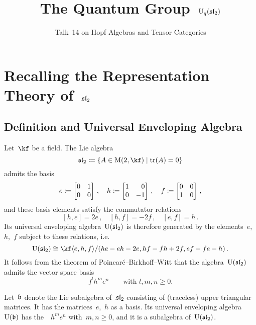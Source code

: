 \documentclass[a4paper, 11pt, oneside]{scrartcl}
\title{The Quantum Group~$\operatorname{U}_q(\mathfrak{sl}_2)$}
\subtitle{Talk~14 on Hopf Algebras and Tensor Categories}
\author{}
\date{}
\begin{document}
\maketitle

\vspace{-4em}





\section{Recalling the Representation Theory of~$\mathfrak{sl}_2$}



\subsection{Definition and Universal Enveloping Algebra}

Let~$\kf$ be a field.
The Lie algebra
\[
  \sllie_2
  \defined
  \{
    A \in \Mat(2, \kf)
  \suchthat
    \tr(A) = 0
  \}
\]
admits the basis
\[
  e
  \defined
  \begin{bmatrix}
    0 & 1 \\
    0 & 0
  \end{bmatrix} \,,
  \quad
  h
  \defined
  \begin{bmatrix*}[r]
    1 &  0 \\
    0 & -1
  \end{bmatrix*} \,,
  \quad
  f
  \defined
  \begin{bmatrix}
    0 & 0 \\
    1 & 0
  \end{bmatrix} \,,
\]
and these basis elements satisfy the commutator relations
\[
  [h, e] = 2e \,,
  \quad
  [h, f] = -2f \,,
  \quad
  [e, f] = h \,.
\]
Its universal enveloping algebra~$\operatorname{U}(\mathfrak{sl}_2)$ is therefore generated by the elements~$e$,~$h$,~$f$ subject to these relations, i.e.
\[
  \Univ(\sllie_2)
  \cong
  \kf\gen{e, h, f}
  /
  \genideal{he - eh - 2e, hf - fh + 2f, ef - fe - h} \,.
\]
It follows from the theorem of Poincaré--Birkhoff--Witt that the algebra~$\operatorname{U}(\mathfrak{sl}_2)$ admits the vector space basis
\[
  f^l h^m e^n
  \qquad
  \text{with~$l, m, n \geq 0$.}
\]

Let~$\mathfrak{b}$ denote the Lie subalgebra of~$\mathfrak{sl}_2$ consisting of (traceless) upper triangular matrices.
It has the matrices~$e$,~$h$ as a basis.
Its universal enveloping algebra~$\operatorname{U}(\mathfrak{b})$ has the~{\PBWbasis}~$h^m e^n$ with~$m, n \geq 0$, and it is a subalgebra of~$\operatorname{U}(\mathfrak{sl}_2)$.
\end{document}
